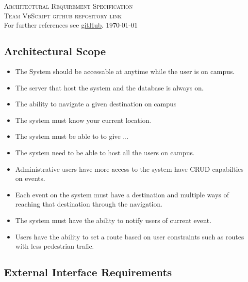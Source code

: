 \documentclass[a4paper,12pt]{report}
\begin{document}
\renewcommand{\thesection}{\arabic{section}}
\newpage
\begin{center}
	\textsc{\LARGE Architectural Requirement Specification}\\[1.5cm]
	\textsc{\Large Team VbScript github repository link}\\[0.5cm]
	For further references see \href{https://github.com/mfanamasimula/VBScript}{gitHub}.
	\today
\end{center}
\newpage
\subsection{Architectural Scope}
\begin{itemize}
	\item The System should be accessable at anytime while the user is on campus.
	\item The server that host the system and the database is always on.
	\item The ability to navigate a given destination on campus
	\item The system must know your current location.
	\item The system must be able to to give ...
	\item The system need to be able to host all the users on campus.
	\item Administrative users have more access to the system have CRUD capabilties on events.
	\item Each event on the system must have a destination and multiple ways of reaching that destination through the navigation.
	\item The system must have the ability to notify users of current event.
	\item Users have the ability to set a route based on user constraints such as routes with less pedestrian trafic. 
\end{itemize}
\newpage
\subsection{External Interface Requirements}
\end{document}
